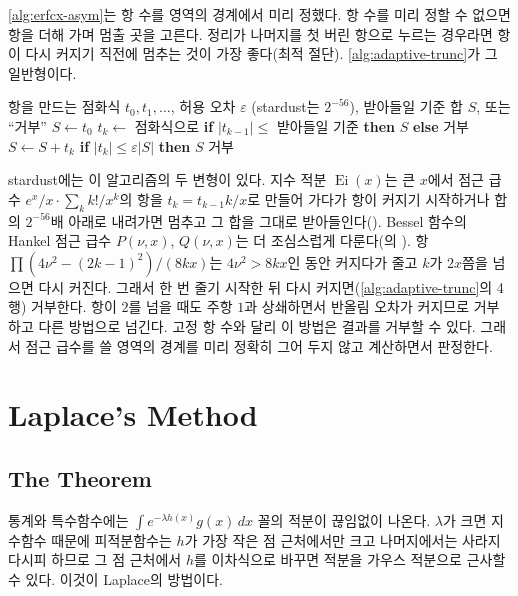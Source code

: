 \cref{alg:erfcx-asym}는 항 수를 영역의 경계에서 미리 정했다. 항 수를 미리 정할 수 없으면 항을 더해 가며 멈출 곳을 고른다. 정리가 나머지를 첫 버린 항으로 누르는 경우라면 항이 다시 커지기 직전에 멈추는 것이 가장 좋다(최적 절단). \cref{alg:adaptive-trunc}가 그 일반형이다.

\begin{algorithm}[htbp]
\begin{algorithmic}[1]
\Require 항을 만드는 점화식 $t_0,t_1,\dots$, 허용 오차 $\varepsilon$ (stardust는 $2^{-56}$), 받아들일 기준
\Ensure 합 $S$, 또는 ``거부''
\State $S\gets t_0$
  \State $t_k\gets$ 점화식으로 
   
    \State \textbf{if} $|t_{k-1}|\le$ 받아들일 기준 \textbf{then} \Return $S$ \textbf{else} \Return 거부
  \EndIf
  \State $S\gets S+t_k$
  \State \textbf{if} $|t_k|\le\varepsilon|S|$ \textbf{then} \Return $S$ 
\EndFor
\State \Return 거부
\end{algorithmic}
\caption{적응형 최적 절단}
\label{alg:adaptive-trunc}
\end{algorithm}

stardust에는 이 알고리즘의 두 변형이 있다. 지수 적분 $\operatorname{Ei}(x)$는 큰 $x$에서 점근 급수 $e^x/x\cdot\sum_kk!/x^k$의 항을 $t_k=t_{k-1}k/x$로 만들어 가다가 항이 커지기 시작하거나 합의 $2^{-56}$배 아래로 내려가면 멈추고 그 합을 그대로 받아들인다(). Bessel 함수의 Hankel 점근 급수 $P(\nu,x)$, $Q(\nu,x)$는 더 조심스럽게 다룬다(의 ). 항 $\prod(4\nu^2-(2k-1)^2)/(8kx)$는 $4\nu^2>8kx$인 동안 커지다가 줄고 $k$가 $2x$쯤을 넘으면 다시 커진다. 그래서 한 번 줄기 시작한 뒤 다시 커지면(\cref{alg:adaptive-trunc}의 4행) 거부한다. 항이 $2$를 넘을 때도 주항 $1$과 상쇄하면서 반올림 오차가 커지므로 거부하고 다른 방법으로 넘긴다. 고정 항 수와 달리 이 방법은 결과를 거부할 수 있다. 그래서 점근 급수를 쓸 영역의 경계를 미리 정확히 그어 두지 않고 계산하면서 판정한다.

\section{Laplace's Method}
\label{sec:laplace}

\subsection{The Theorem}

통계와 특수함수에는 $\int e^{-\lambda h(x)}g(x)\,dx$ 꼴의 적분이 끊임없이 나온다. $\lambda$가 크면 지수함수 때문에 피적분함수는 $h$가 가장 작은 점 근처에서만 크고 나머지에서는 사라지다시피 하므로 그 점 근처에서 $h$를 이차식으로 바꾸면 적분을 가우스 적분으로 근사할 수 있다. 이것이 Laplace의 방법이다\cite{debruijn1958asymptotic}.


